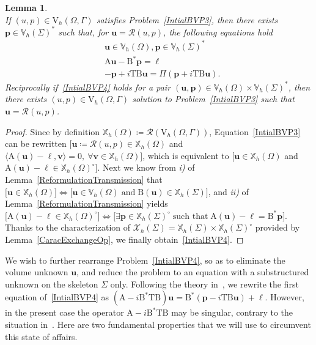 \documentclass[a4paper,11pt]{article}
\newcommand{\mA}{\mathrm{A}}
\newcommand{\mB}{\mathrm{B}}
\newcommand{\mT}{\mathrm{T}}
\newcommand{\mbV}{\mathbb{V}}
\newcommand{\mbX}{\mathbb{X}}
\newcommand{\Vh}{\mathrm{V}_{h}}
\newcommand{\bell}{\boldsymbol{\ell}}
\newcommand{\bp}{\boldsymbol{p}}
\newcommand{\bu}{\boldsymbol{u}}
\newcommand{\bv}{\boldsymbol{v}}
\newtheorem{lem}[defn]{Lemma}
\begin{document}
\begin{lem}\quad\\
  If $(u,p)\in\Vh(\Omega,\Gamma)$ satisfies Problem~\eqref{IntialBVP3}, then
  there exists $\bp\in \mbV_h(\Sigma)^*$ such that, for $\bu =
  \mathcal{R}(u,p)$, the following equations hold
  \begin{equation}\label{IntialBVP4}
    \begin{aligned}
      & \bu \in \mbV_h(\Omega), \bp\in \mbV_h(\Sigma)^*\\
      & \mA\bu - \mB^{*}\bp = \bell\\
      & -\bp+i\mT\mB\bu = \Pi(\bp+i\mT\mB\bu).
    \end{aligned}
  \end{equation}
  Reciprocally if~\eqref{IntialBVP4} holds for a pair
  $(\bu,\bp)\in \mbV_h(\Omega)\times \mbV_h(\Sigma)^{*}$, then
  there exists $(u,p)\in \Vh(\Omega,\Gamma)$ solution to Problem~\eqref{IntialBVP3} such that $\bu = \mathcal{R}(u,p)$.
\end{lem}

\begin{proof}
  Since by definition \(\mbX_h(\Omega) \coloneq \mathcal{R}(\Vh(\Omega,\Gamma))\), Equation~\eqref{IntialBVP3} can be rewritten \(\lbrack \bu \coloneq \mathcal{R}(u,p)\in \mbX_h(\Omega)\) and \(\langle \mA(\bu)-\bell,\bv\rangle = 0,\ \forall \bv\in\mbX_h(\Omega) \rbrack\), which is equivalent to \(\lbrack \bu\in \mbX_h(\Omega)\) and
  \(\mA(\bu)-\bell\in \mbX_h(\Omega)^{\circ} \rbrack\). Next we know from \textit{i)} of Lemma~\ref{ReformulationTransmission} that \(\lbrack \bu\in \mbX_h(\Omega)\rbrack\iff \lbrack \bu\in
  \mbV_h(\Omega) \;\text{and}\; \mB(\bu)\in \mbX_h(\Sigma) \rbrack\), and \textit{ii)} of Lemma~\ref{ReformulationTransmission} yields \(
  \lbrack \mA(\bu)-\bell\in \mbX_h(\Omega)^{\circ}\rbrack \iff\lbrack
  \exists\bp\in \mbX_h(\Sigma)^{\circ}\;\text{such that}\;\mA(\bu)-\bell = \mB^{*}\bp \rbrack
  \). Thanks to the characterization of \(\mathscr{X}_h(\Sigma) = \mbX_h(\Sigma)\times \mbX_h(\Sigma)^{\circ}\) provided by Lemma~\ref{CaracExchangeOp}, we finally obtain~\eqref{IntialBVP4}.
\end{proof}

We wish to further rearrange Problem~\eqref{IntialBVP4}, so as to
eliminate the volume unknown $\bu$, and reduce the problem to an
equation with a substructured unknown on the skeleton $\Sigma$ only. Following the theory in~\cite{MR4648528,MR4433119}, we rewrite the first equation of~\eqref{IntialBVP4} as $(\mA -i\mB^*\mT\mB)\bu
=\mB^{*}(\bp-i\mT\mB\bu) + \bell$. However, in the present case the
operator $\mA -i\mB^*\mT\mB$ may be singular, contrary to
the situation in~\cite{MR4648528,MR4433119}. 
Here are two fundamental 
properties that we will use to circumvent this state of affairs.
\end{document}
